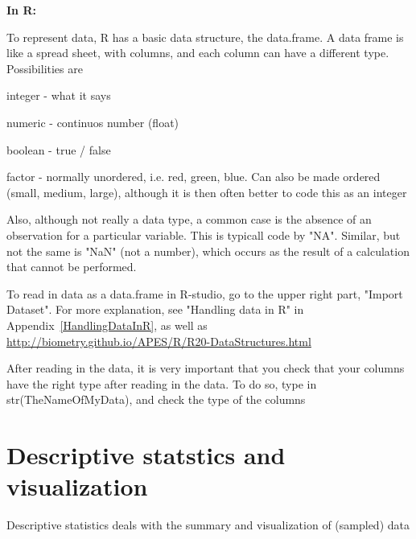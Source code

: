 \documentclass[a4paper,twoside]{tufte-book}\usepackage[]{graphicx}\usepackage[]{color}
\begin{document}
\vspace{1cm}
\begin{fullwidth}
\begin{mdframed}
    
\textbf{In R:} 

To represent data, R has a basic data structure, the data.frame. A data frame is like a spread sheet, with columns, and each column can have a different type. Possibilities are

\begin{itemize*}
  \item integer - what it says
  \item numeric - continuos number (float)
  \item boolean - true / false
  \item factor - normally unordered, i.e. red, green, blue. Can also be made ordered (small, medium, large), although it is then often better to code this as an integer
\end{itemize*}


Also, although not really a data type, a common case is the absence of an observation for a particular variable. This is typicall code by "NA". Similar, but not the same is "NaN" (not a number), which occurs as the result of a calculation that cannot be performed. 

To read in data as a data.frame in R-studio, go to the upper right part, "Import Dataset". For more explanation, see "Handling data in R" in Appendix~\ref{HandlingDataInR}, as well as \href{http://biometry.github.io/APES/R/R20-DataStructures.html}{http://biometry.github.io/APES/R/R20-DataStructures.html}

After reading in the data, it is very important that you check that your columns have the right type after reading in the data. To do so, type in str(TheNameOfMyData), and check the type of the columns

\end{mdframed}
\end{fullwidth}


\chapter{Descriptive statstics and visualization}

Descriptive statistics deals with the summary and visualization of (sampled) data
\end{document}
